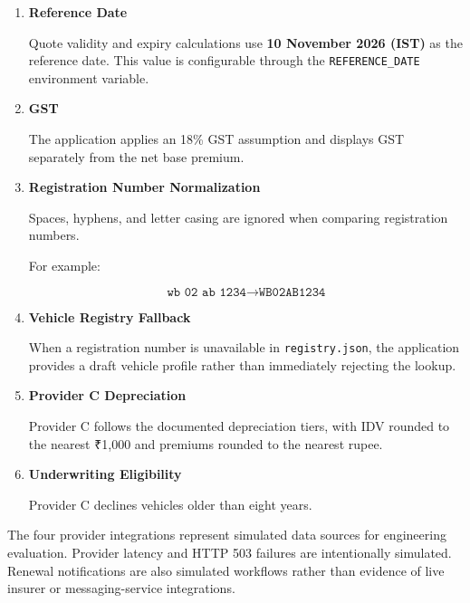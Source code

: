 \documentclass[11pt,a4paper]{article}
\begin{document}
\begin{enumerate}

    \item \textbf{Reference Date}

    Quote validity and expiry calculations use
    \textbf{10 November 2026 (IST)} as the reference date.
    This value is configurable through the
    \texttt{REFERENCE\_DATE} environment variable.

    \item \textbf{GST}

    The application applies an 18\% GST assumption and
    displays GST separately from the net base premium.

    \item \textbf{Registration Number Normalization}

    Spaces, hyphens, and letter casing are ignored when
    comparing registration numbers.

    For example:

    \[
    \texttt{wb 02 ab 1234}
    \longrightarrow
    \texttt{WB02AB1234}
    \]

    \item \textbf{Vehicle Registry Fallback}

    When a registration number is unavailable in
    \texttt{registry.json}, the application provides a
    draft vehicle profile rather than immediately
    rejecting the lookup.

    \item \textbf{Provider C Depreciation}

    Provider C follows the documented depreciation tiers,
    with IDV rounded to the nearest ₹1,000 and premiums
    rounded to the nearest rupee.

    \item \textbf{Underwriting Eligibility}

    Provider C declines vehicles older than eight years.

\end{enumerate}

\begin{warningbox}[title={Simulation Scope}]
The four provider integrations represent simulated data sources
for engineering evaluation. Provider latency and HTTP 503 failures
are intentionally simulated. Renewal notifications are also
simulated workflows rather than evidence of live insurer or
messaging-service integrations.
\end{warningbox}
\end{document}
